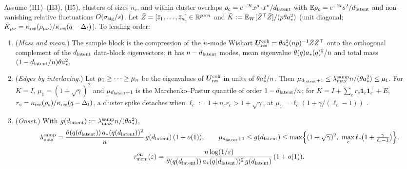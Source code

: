 \begin{proposition}\label{prop:onset-buf}
Assume (H1)--(H3), (H5), clusters of sizes $n_c$, and within-cluster overlaps $\rho_c=e^{-2t}x^\mu\!\cdot\!x^\nu/d_{\mathrm{latent}}$ with $\mathbb{E}\rho_c=e^{-2t}s^2/d_{\mathrm{latent}}$ and non-vanishing relative fluctuations $O(\sigma_{\mathrm{sig}}/s)$. Let $\bar Z=[\bar z_1,\dots,\bar z_{n}]\in\mathbb{R}^{p\times n}$ and $\bar K:=\mathbb{E}_W[\bar Z^\top\bar Z]/(p\theta a_*^2)$ (unit diagonal; $\bar K_{\mu\nu}=\kappa_{\rm res}(\rho_{\mu\nu})/\kappa_{\rm res}(q-\Delta_t)$). To leading order:
\begin{enumerate}
\item[(a)] (\emph{Mass and mean.}) The sample block is the compression of the $n$-mode Wishart $\bm{U}^{\rm coh}_{\rm res}=\theta a_*^2(np)^{-1}\bar Z\bar Z^\top$ onto the orthogonal complement of the $d_{\mathrm{latent}}$ data-block eigenvectors; it has $n-d_{\mathrm{latent}}$ modes, mean eigenvalue $\theta(q)a_*(q)^2/n$ and total mass $(1-d_{\mathrm{latent}}/n)\theta a_*^2$.
\item[(b)] (\emph{Edges by interlacing.}) Let $\mu_1\ge\dots\ge\mu_{n}$ be the eigenvalues of $\bm{U}^{\rm coh}_{\rm res}$ in units of $\theta a_*^2/n$. Then $\mu_{d_{\mathrm{latent}}+1}\le\lambda^{\rm samp}_{\max}n/(\theta a_*^2)\le\mu_1$. For $\bar K=I$, $\mu_1=(1+\sqrt\gamma)^2$ and $\mu_{d_{\mathrm{latent}}+1}$ is the Marchenko--Pastur quantile of order $1-d_{\mathrm{latent}}/n$; for $\bar K=I+\sum_cr_c\mathbf 1_c\mathbf 1_c^\top+E$, $r_c=\kappa_{\rm res}(\rho_c)/\kappa_{\rm res}(q-\Delta_t)$, a cluster spike detaches when $\ell_c:=1+n_cr_c>1+\sqrt\gamma$, at $\mu_1=\ell_c(1+\gamma/(\ell_c-1))$ \citep{baik2005phase}.
\item[(c)] (\emph{Onset.}) With $g(d_{\mathrm{latent}}):=\lambda^{\rm samp}_{\max}n/(\theta a_*^2)$,
\begin{equation}
\lambda^{\rm samp}_{\max}=\frac{\theta(q(\dlat))\,a_*(q(\dlat))^2}{\nsamp}\,g(\dlat)\,(1+o(1)),\qquad \mu_{\dlat+1}\le g(\dlat)\le\max\Bigl\{(1+\sqrt\gamma)^2,\ \max_c\ell_c\bigl(1+\tfrac{\gamma}{\ell_c-1}\bigr)\Bigr\},
\label{eq:lmax-samp-buf}
\end{equation}
\begin{equation}
\tau_{\mathrm{mem}}^{\rm on}(\varepsilon)=\frac{n\log(1/\varepsilon)}{\theta(q(d_{\mathrm{latent}}))\,a_*(q(d_{\mathrm{latent}}))^2\,g(d_{\mathrm{latent}})}\,(1+o(1)).
\label{eq:tauon-buf}
\end{equation}
\end{enumerate}

\end{proposition}
